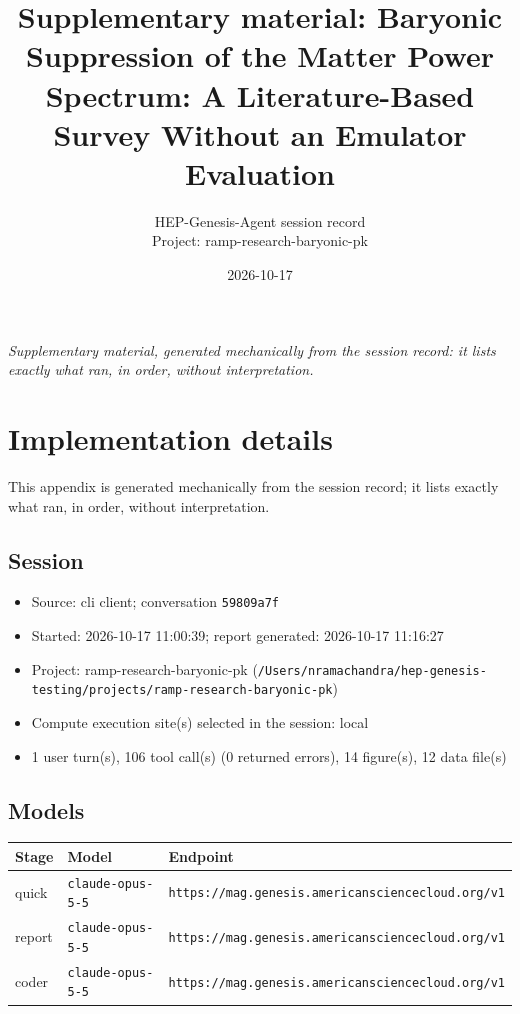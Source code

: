 \documentclass[11pt,a4paper]{article}
\title{Supplementary material: Baryonic Suppression of the Matter Power Spectrum: A Literature-Based Survey Without an Emulator Evaluation}
\author{HEP-Genesis-Agent session record \\ \small Project: ramp-research-baryonic-pk}
\date{2026-10-17}
\begin{document}
\maketitle
\noindent\textit{\small Supplementary material, generated mechanically from the session record: it lists exactly what ran, in order, without interpretation.}
\vspace{1em}



\appendix
\section{Implementation details}
\label{app:impl}
This appendix is generated mechanically from the session record; it lists exactly what ran, in order, without interpretation.
\subsection{Session}
\begin{itemize}
  \item Source: cli client; conversation \texttt{59809a7f}
  \item Started: 2026-10-17 11:00:39; report generated: 2026-10-17 11:16:27
  \item Project: ramp-research-baryonic-pk (\texttt{/\allowbreak{}Users/\allowbreak{}nramachandra/\allowbreak{}hep-genesis-testing/\allowbreak{}projects/\allowbreak{}ramp-research-baryonic-pk})
  \item Compute execution site(s) selected in the session: local
  \item 1 user turn(s), 106 tool call(s) (0 returned errors), 14 figure(s), 12 data file(s)
\end{itemize}
\subsection{Models}
\begin{longtable}{@{}p{}p{}p{}@{}}
\toprule Stage & Model & Endpoint \\ \midrule \endhead
quick & \texttt{claude-opus-5-5} & \texttt{https:\allowbreak{}/\allowbreak{}/\allowbreak{}mag.genesis.americansciencecloud.org/\allowbreak{}v1} \\
report & \texttt{claude-opus-5-5} & \texttt{https:\allowbreak{}/\allowbreak{}/\allowbreak{}mag.genesis.americansciencecloud.org/\allowbreak{}v1} \\
coder & \texttt{claude-opus-5-5} & \texttt{https:\allowbreak{}/\allowbreak{}/\allowbreak{}mag.genesis.americansciencecloud.org/\allowbreak{}v1} \\
\bottomrule\end{longtable}
\end{document}
